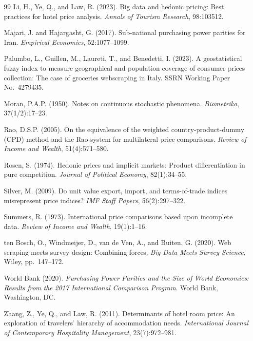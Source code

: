 \documentclass[12pt,a4paper]{article}
\begin{document}
\begin{thebibliography}{99}
Li, H., Ye, Q., and Law, R. (2023).
Big data and hedonic pricing: Best practices for hotel price analysis.
\textit{Annals of Tourism Research}, 98:103512.

Majari, J. and Hajargasht, G. (2017).
Sub-national purchasing power parities for Iran.
\textit{Empirical Economics}, 52:1077--1099.

Palumbo, L., Guillen, M., Laureti, T., and Benedetti, I. (2023).
A geostatistical fuzzy index to measure geographical and population coverage of consumer prices collection: The case of groceries webscraping in Italy.
SSRN Working Paper No.\ 4279435.

Moran, P.A.P. (1950).
Notes on continuous stochastic phenomena.
\textit{Biometrika}, 37(1/2):17--23.

Rao, D.S.P. (2005).
On the equivalence of the weighted country-product-dummy (CPD) method and the Rao-system for multilateral price comparisons.
\textit{Review of Income and Wealth}, 51(4):571--580.

Rosen, S. (1974).
Hedonic prices and implicit markets: Product differentiation in pure competition.
\textit{Journal of Political Economy}, 82(1):34--55.

Silver, M. (2009).
Do unit value export, import, and terms-of-trade indices misrepresent price indices?
\textit{IMF Staff Papers}, 56(2):297--322.

Summers, R. (1973).
International price comparisons based upon incomplete data.
\textit{Review of Income and Wealth}, 19(1):1--16.

ten Bosch, O., Windmeijer, D., van de Ven, A., and Buiten, G. (2020).
Web scraping meets survey design: Combining forces.
\textit{Big Data Meets Survey Science}, Wiley, pp.\ 147--172.

World Bank (2020).
\textit{Purchasing Power Parities and the Size of World Economies: Results from the 2017 International Comparison Program}.
World Bank, Washington, DC.

Zhang, Z., Ye, Q., and Law, R. (2011).
Determinants of hotel room price: An exploration of travelers' hierarchy of accommodation needs.
\textit{International Journal of Contemporary Hospitality Management}, 23(7):972--981.

\end{thebibliography}
\end{document}
